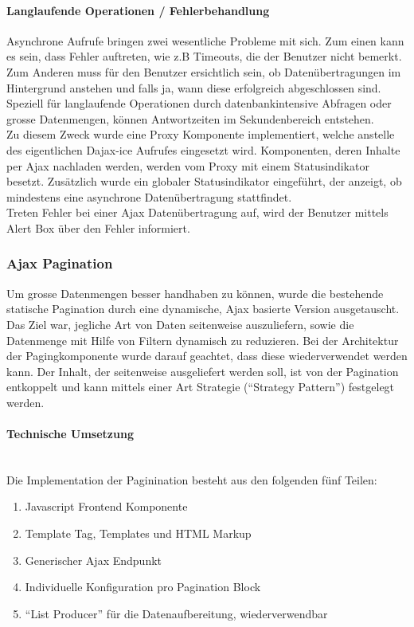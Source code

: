 \paragraph{Langlaufende Operationen / Fehlerbehandlung} Asynchrone Aufrufe
bringen zwei wesentliche Probleme mit sich. Zum einen kann es sein, dass Fehler
auftreten, wie z.B Timeouts, die der Benutzer nicht bemerkt. Zum Anderen muss
für den Benutzer ersichtlich sein, ob Datenübertragungen im Hintergrund anstehen
und falls ja, wann diese erfolgreich abgeschlossen sind. Speziell für
langlaufende Operationen durch datenbankintensive Abfragen oder grosse
Datenmengen, können Antwortzeiten im Sekundenbereich entstehen. \\ Zu diesem
Zweck wurde eine Proxy Komponente \cite{gamma1994design} implementiert, welche
anstelle des eigentlichen Dajax-ice Aufrufes eingesetzt wird. Komponenten, deren
Inhalte per Ajax nachladen werden, werden vom Proxy mit einem Statusindikator
besetzt. Zusätzlich wurde ein globaler Statusindikator eingeführt, der anzeigt,
ob mindestens eine asynchrone Datenübertragung stattfindet.\\ Treten Fehler bei
einer Ajax Datenübertragung auf, wird der Benutzer mittels Alert Box über den
Fehler informiert.

\subsubsection{Ajax Pagination} 
Um grosse Datenmengen besser handhaben zu können, wurde die bestehende statische
Pagination durch eine dynamische, Ajax basierte Version ausgetauscht. Das Ziel
war, jegliche Art von Daten seitenweise auszuliefern, sowie die Datenmenge mit
Hilfe von Filtern dynamisch zu reduzieren. Bei der Architektur der
Pagingkomponente wurde darauf geachtet, dass diese wiederverwendet werden kann.
Der Inhalt, der seitenweise ausgeliefert werden soll, ist von der Pagination
entkoppelt und kann mittels einer Art Strategie (\enquote{Strategy Pattern}\cite{gamma1994design}) festgelegt werden.

\paragraph{Technische Umsetzung} \hspace{0pt} \\
Die Implementation der Paginination besteht aus den folgenden fünf Teilen:
\begin{enumerate}
	\item Javascript Frontend Komponente
	\item Template Tag, Templates und HTML Markup
	\item Generischer Ajax Endpunkt
	\item Individuelle Konfiguration pro Pagination Block
	\item \enquote{List Producer} für die Datenaufbereitung, wiederverwendbar
\end{enumerate}

